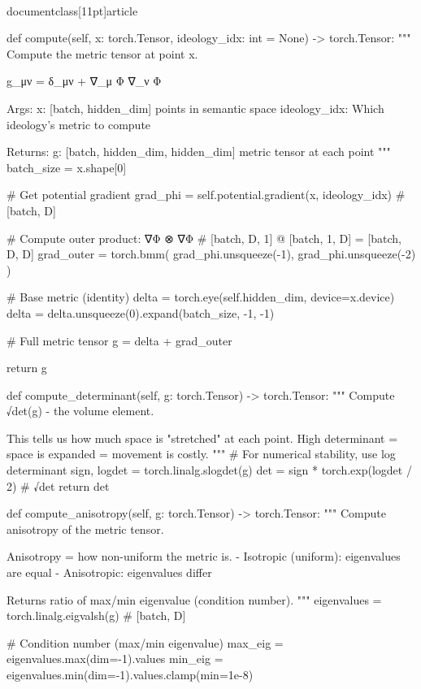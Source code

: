 \\documentclass[11pt]{article}
\begin{document}
\begin{CodeBlock}
    def compute(self, x: torch.Tensor, ideology_idx: int = None) -> torch.Tensor:
        """
        Compute the metric tensor at point x.

        g_μν = δ_μν + ∇_μ Φ ∇_ν Φ

        Args:
            x: [batch, hidden_dim] points in semantic space
            ideology_idx: Which ideology's metric to compute

        Returns:
            g: [batch, hidden_dim, hidden_dim] metric tensor at each point
        """
        batch_size = x.shape[0]

        # Get potential gradient
        grad_phi = self.potential.gradient(x, ideology_idx)  # [batch, D]

        # Compute outer product: ∇Φ ⊗ ∇Φ
        # [batch, D, 1] @ [batch, 1, D] = [batch, D, D]
        grad_outer = torch.bmm(
            grad_phi.unsqueeze(-1),
            grad_phi.unsqueeze(-2)
        )

        # Base metric (identity)
        delta = torch.eye(self.hidden_dim, device=x.device)
        delta = delta.unsqueeze(0).expand(batch_size, -1, -1)

        # Full metric tensor
        g = delta + grad_outer

        return g

    def compute_determinant(self, g: torch.Tensor) -> torch.Tensor:
        """
        Compute √det(g) - the volume element.

        This tells us how much space is "stretched" at each point.
        High determinant = space is expanded = movement is costly.
        """
        # For numerical stability, use log determinant
        sign, logdet = torch.linalg.slogdet(g)
        det = sign * torch.exp(logdet / 2)  # √det
        return det

    def compute_anisotropy(self, g: torch.Tensor) -> torch.Tensor:
        """
        Compute anisotropy of the metric tensor.

        Anisotropy = how non-uniform the metric is.
        - Isotropic (uniform): eigenvalues are equal
        - Anisotropic: eigenvalues differ

        Returns ratio of max/min eigenvalue (condition number).
        """
        eigenvalues = torch.linalg.eigvalsh(g)  # [batch, D]

        # Condition number (max/min eigenvalue)
        max_eig = eigenvalues.max(dim=-1).values
        min_eig = eigenvalues.min(dim=-1).values.clamp(min=1e-8)


\end{CodeBlock}
\end{document}

